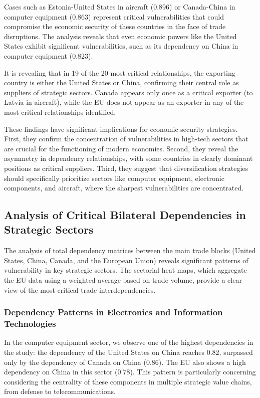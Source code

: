 \documentclass[final,1p,times,authoryear]{elsarticle}
\begin{document}
Cases such as Estonia-United States in aircraft (0.896) or Canada-China in computer equipment (0.863) represent critical vulnerabilities that could compromise the economic security of these countries in the face of trade disruptions. The analysis reveals that even economic powers like the United States exhibit significant vulnerabilities, such as its dependency on China in computer equipment (0.823).

It is revealing that in 19 of the 20 most critical relationships, the exporting country is either the United States or China, confirming their central role as suppliers of strategic sectors. Canada appears only once as a critical exporter (to Latvia in aircraft), while the EU does not appear as an exporter in any of the most critical relationships identified.

These findings have significant implications for economic security strategies. First, they confirm the concentration of vulnerabilities in high-tech sectors that are crucial for the functioning of modern economies. Second, they reveal the asymmetry in dependency relationships, with some countries in clearly dominant positions as critical suppliers. Third, they suggest that diversification strategies should specifically prioritize sectors like computer equipment, electronic components, and aircraft, where the sharpest vulnerabilities are concentrated.

\subsection{Analysis of Critical Bilateral Dependencies in Strategic Sectors}

The analysis of total dependency matrices between the main trade blocks (United States, China, Canada, and the European Union) reveals significant patterns of vulnerability in key strategic sectors. The sectorial heat maps, which aggregate the EU data using a weighted average based on trade volume, provide a clear view of the most critical trade interdependencies.

\subsubsection{Dependency Patterns in Electronics and Information Technologies}

In the computer equipment sector, we observe one of the highest dependencies in the study: the dependency of the United States on China reaches 0.82, surpassed only by the dependency of Canada on China (0.86). The EU also shows a high dependency on China in this sector (0.78). This pattern is particularly concerning considering the centrality of these components in multiple strategic value chains, from defense to telecommunications.
\end{document}
